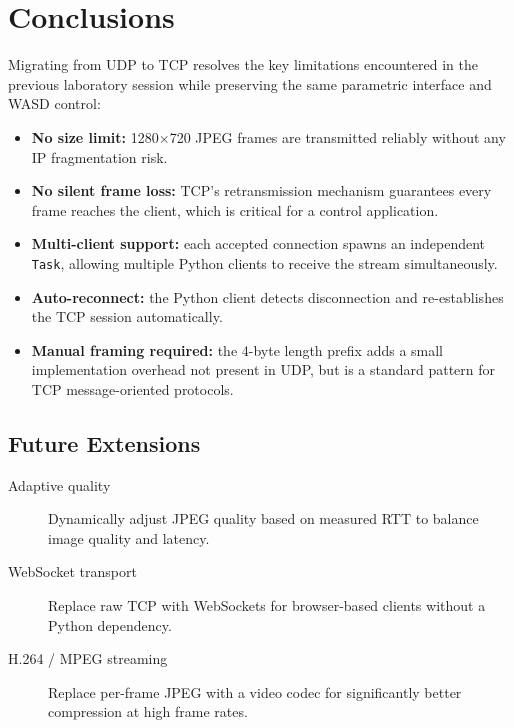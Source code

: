 \documentclass[12pt,a4paper]{article}
\begin{document}
\section{Conclusions}

Migrating from UDP to TCP resolves the key limitations encountered in the previous
laboratory session while preserving the same parametric interface and WASD control:

\begin{itemize}
    \item \textbf{No size limit:} 1280$\times$720 JPEG frames are transmitted reliably
          without any IP fragmentation risk.
    \item \textbf{No silent frame loss:} TCP's retransmission mechanism guarantees
          every frame reaches the client, which is critical for a control application.
    \item \textbf{Multi-client support:} each accepted connection spawns an independent
          \texttt{Task}, allowing multiple Python clients to receive the stream
          simultaneously.
    \item \textbf{Auto-reconnect:} the Python client detects disconnection and
          re-establishes the TCP session automatically.
    \item \textbf{Manual framing required:} the 4-byte length prefix adds a small
          implementation overhead not present in UDP, but is a standard pattern for
          TCP message-oriented protocols.
\end{itemize}

\subsection{Future Extensions}

\begin{description}
    \item[Adaptive quality] Dynamically adjust JPEG quality based on measured RTT to
    balance image quality and latency.
    \item[WebSocket transport] Replace raw TCP with WebSockets for browser-based
    clients without a Python dependency.
    \item[H.264 / MPEG streaming] Replace per-frame JPEG with a video codec for
    significantly better compression at high frame rates.
\end{description}
\end{document}
